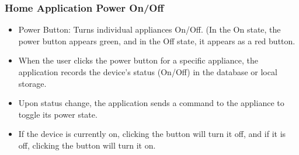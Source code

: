 \documentclass[conference]{IEEEtran}
\begin{document}
\subsubsection{Home Application Power On/Off}

\begin{itemize}
    \item Power Button: Turns individual appliances On/Off. (In the On state, the power button appears green, and in the Off state, it appears as a red button.\\
    \item When the user clicks the power button for a specific appliance, the application records the device's status (On/Off) in the database or local storage.\\
    \item Upon status change, the application sends a command to the appliance to toggle its power state.\\
    \item If the device is currently on, clicking the button will turn it off, and if it is off, clicking the button will turn it on.\\
\end{itemize}\\
\end{document}
